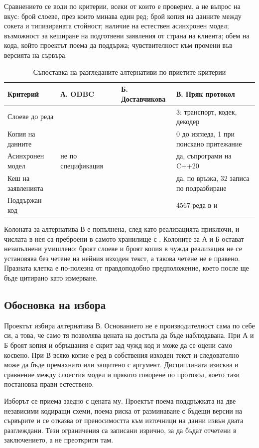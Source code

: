 Сравнението се води по критерии, всеки от които е проверим, а не въпрос на вкус: брой
слоеве, през които минава един ред; брой копия на данните между сокета и типизираната
стойност; наличие на естествен асинхронен модел; възможност за кеширане на подготвени
заявления от страна на клиента; обем на кода, който проектът поема да поддържа;
чувствителност към промени във версията на сървъра.

\begin{table}[H]
\centering
\caption{Съпоставка на разгледаните алтернативи по приетите критерии}
\label{tab:alternatives}
\begin{tabular}{L{3.4cm}L{3.2cm}L{3.0cm}L{3.6cm}}
\toprule
\textbf{Критерий} & \textbf{А. ODBC} & \textbf{Б. Доставчикова} & \textbf{В. Пряк протокол} \\
\midrule
Слоеве до реда     &  &  & 3: транспорт, кодек, декодер \\
Копия на данните   &  &  & 0 до изгледа, 1 при поискано притежание \\
Асинхронен модел   & не по спецификация~\cite{odbc_ref} &  & да, съпрограми на C++20 \\
Кеш на заявленията &  &  & да, по връзка, 32 записа по подразбиране \\
Поддържан код      &  &  & 4567 реда в  и  \\
\bottomrule
\end{tabular}
\end{table}

Колоната за алтернатива В  е попълнена, след като реализацията
приключи, и числата в нея са преброени в самото хранилище с
. Колоните за А и Б остават
незапълнени умишлено: броят слоеве и броят копия в чужда реализация не се установява
без четене на нейния изходен текст, а такова четене не е правено. Празната клетка е
по-полезна от правдоподобно предположение, което после ще бъде цитирано като измерване.

\subsection{Обосновка на избора}

Проектът избира алтернатива В. Основанието не е производителност сама по себе си, а
това, че само тя позволява цената на достъпа да бъде наблюдавана. При А и Б броят
копия и обръщания е скрит зад чужд код и може да се оцени само косвено. При В всяко
копие е ред в собствения изходен текст и следователно може да бъде премахнато или
защитено с аргумент. Дисциплината изисква и сравнение между слоестия модел и прякото
говорене по протокол, което тази постановка прави естествено.

Изборът се приема заедно с цената му. Проектът поема поддръжката на две независими
кодиращи схеми, поема риска от разминаване с бъдещи версии на сървърите и се отказва
от преносимостта към източници на данни извън двата разглеждани. Тези ограничения са
записани изрично, за да бъдат отчетени в заключението, а не преоткрити там.
